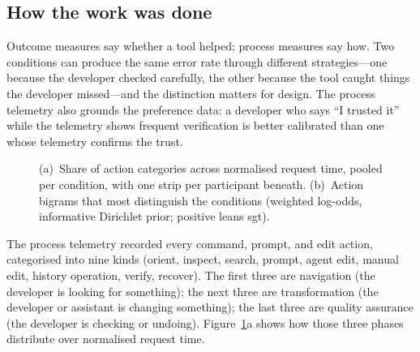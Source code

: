 \subsection{How the work was done}
\label{sec:findings-process}

Outcome measures say whether a tool helped; process measures say how. Two
conditions can produce the same error rate through different strategies---one
because the developer checked carefully, the other because the tool caught
things the developer missed---and the distinction matters for design. The
process telemetry also grounds the preference data: a developer who says ``I
trusted it'' while the telemetry shows frequent verification is better
calibrated than one whose telemetry confirms the trust.

\begin{figure}[t]
  \centering
  \caption{(a)~Share of action categories across normalised request time, pooled
  per condition, with one strip per participant beneath.
  (b)~Action bigrams that most distinguish the conditions (weighted log-odds,
  informative Dirichlet prior; positive leans sgt).}
  \label{fig:process}
\end{figure}

The process telemetry recorded every command, prompt, and edit action,
categorised into nine kinds (orient, inspect, search, prompt, agent edit, manual
edit, history operation, verify, recover). The first three are navigation (the
developer is looking for something); the next three are transformation (the
developer or assistant is changing something); the last three are quality
assurance (the developer is checking or undoing). Figure~\ref{fig:process}a
shows how those three phases distribute over normalised request time.


